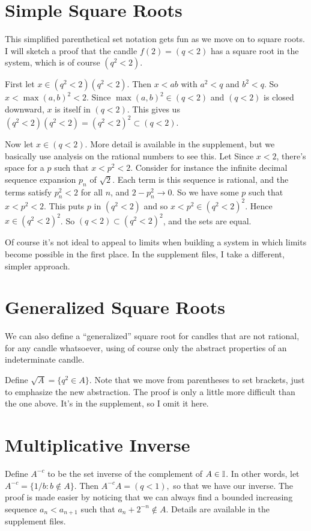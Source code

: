 \documentclass{article}
\newcommand{\q}{\enquote}
\begin{document}
{{\section{Simple Square Roots}
This simplified parenthetical set notation gets fun as we move on to square roots.  I will sketch a proof that the candle $f(2) = (q < 2)$ has a square root in the system, which is of course $( q^2 < 2)$. 

First let $x \in ( q^2 < 2)( q^2 < 2)$. Then $x < ab$ with $a^2 < q$ and $ b^2 < q$. So $x < \max(a,b)^2 < 2$. Since $\max(a,b)^2 \in (q < 2)$ and $(q < 2)$ is closed downward, $x$ is itself in $(q < 2)$. This gives us $( q^2 < 2)( q^2 < 2) = ( q^2 < 2)^2 \subset (q < 2).$

Now let $x \in (q < 2)$. More detail is available in the supplement, but we basically use analysis on the rational numbers to see this. Let Since $x < 2$, there's space for a $p$ such that $x < p^2 < 2$. Consider for instance the infinite decimal sequence expansion $p_n$ of $\sqrt{2}$. Each term is this sequence is rational, and the terms satisfy $p_n^2 < 2$ for all $n$, and $2 - p_n^2 \to 0$.  So we have some $p$ such that $x < p^2 < 2$. This puts $p$ in $( q^2 < 2)$ and so $x < p^2 \in ( q^2 < 2)^2$. Hence $x \in ( q^2 < 2)^2$. So  $(q < 2) \subset ( q^2 < 2)^2$, and the sets are equal. 

Of course it's not ideal to appeal to limits when building a system in which limits become possible in the first place. In the supplement files, I take a different, simpler approach. 

\section{Generalized Square Roots}

We can also define a \q{generalized} square root for candles that are not rational, for any candle whatsoever, using of course only the abstract properties of an indeterminate candle. 

Define $\sqrt{A} = \{ q^2 \in A \}$. Note that we move from parentheses to set brackets, just to emphasize the new abstraction. The proof is only a little more difficult than the one above. It's in the supplement, so I omit it here. 
 
\section{Multiplicative Inverse}

Define $A^{-c}$ to be the set inverse of the complement of $A \in \Bbb I$. In other words, let $A^{-c} = \{ 1/b : b \notin A\}$. Then $A^{-c}A = (q < 1),$ so that we have our inverse. The proof is made easier by noticing that we can always find a bounded increasing sequence $a_n < a_{n+1}$ such that $a_n + 2^{-n} \notin A$.  Details are available in the supplement files. 

}}
\end{document}
